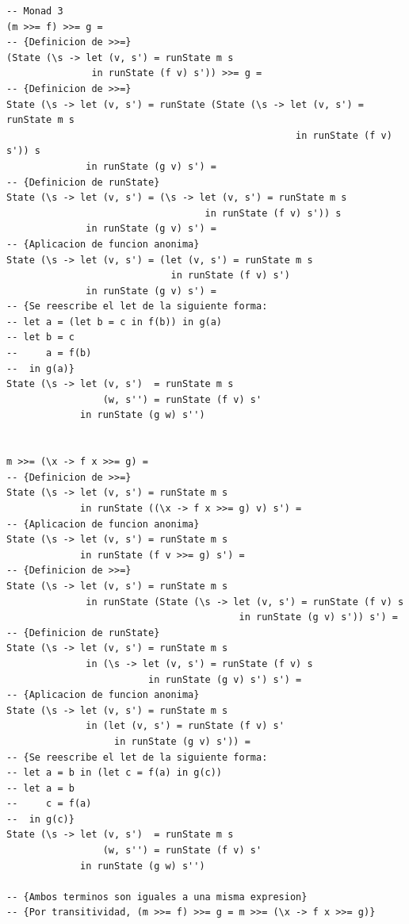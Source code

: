 \documentclass{article}
\begin{document}
\begin{lstlisting}
-- Monad 3
(m >>= f) >>= g =                                              
-- {Definicion de >>=}
(State (\s -> let (v, s') = runState m s 
               in runState (f v) s')) >>= g =                  
-- {Definicion de >>=}
State (\s -> let (v, s') = runState (State (\s -> let (v, s') = runState m s 
                                                   in runState (f v) s')) s 
              in runState (g v) s') =                          
-- {Definicion de runState} 
State (\s -> let (v, s') = (\s -> let (v, s') = runState m s 
                                   in runState (f v) s')) s 
              in runState (g v) s') =                          
-- {Aplicacion de funcion anonima}
State (\s -> let (v, s') = (let (v, s') = runState m s 
                             in runState (f v) s')
              in runState (g v) s') =                          
-- {Se reescribe el let de la siguiente forma:  
-- let a = (let b = c in f(b)) in g(a)
-- let b = c
--     a = f(b)
--  in g(a)}
State (\s -> let (v, s')  = runState m s 
                 (w, s'') = runState (f v) s'
             in runState (g w) s'')

 
m >>= (\x -> f x >>= g) =                                      
-- {Definicion de >>=}
State (\s -> let (v, s') = runState m s 
             in runState ((\x -> f x >>= g) v) s') =          
-- {Aplicacion de funcion anonima}
State (\s -> let (v, s') = runState m s 
             in runState (f v >>= g) s') =                    
-- {Definicion de >>=}
State (\s -> let (v, s') = runState m s 
              in runState (State (\s -> let (v, s') = runState (f v) s
                                         in runState (g v) s')) s') =   
-- {Definicion de runState}
State (\s -> let (v, s') = runState m s 
              in (\s -> let (v, s') = runState (f v) s
                         in runState (g v) s') s') =           
-- {Aplicacion de funcion anonima}
State (\s -> let (v, s') = runState m s 
              in (let (v, s') = runState (f v) s'
                   in runState (g v) s')) =                    
-- {Se reescribe el let de la siguiente forma:  
-- let a = b in (let c = f(a) in g(c))
-- let a = b
--     c = f(a)
--  in g(c)}
State (\s -> let (v, s')  = runState m s 
                 (w, s'') = runState (f v) s'
             in runState (g w) s'')
             
-- {Ambos terminos son iguales a una misma expresion}
-- {Por transitividad, (m >>= f) >>= g = m >>= (\x -> f x >>= g)}
\end{lstlisting}
	
\end{document}
